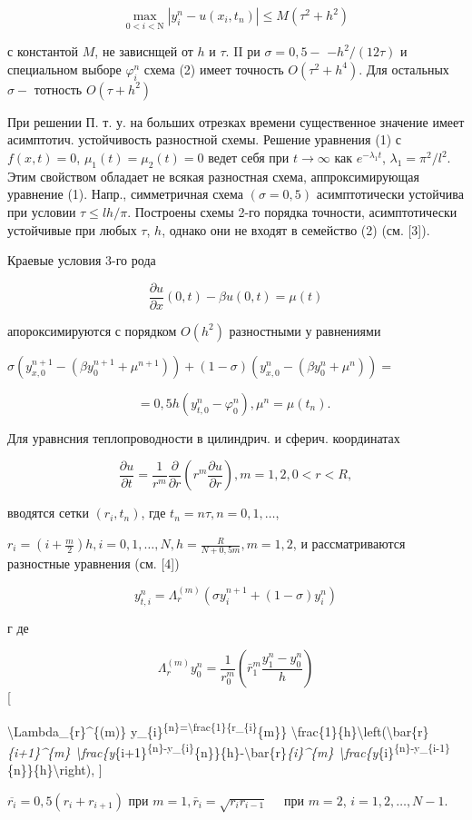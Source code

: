 \documentclass[10pt]{article}
\begin{document}
\[
\max _{0<i<\mathrm{N}}\left|y_{i}^{n}-u\left(x_{i}, t_{n}\right)\right| \leqslant M\left(\tau^{2}+h^{2}\right)
\]

с константой $M$, не зависнщей от $h$ и $\tau$. II ри $\sigma=0,5-$ $-h^{2} /(12 \tau)$ и специальном выборе $\varphi_{i}^{n}$ схема (2) имеет точность $O\left(\tau^{2}+h^{4}\right)$. Для остальных $\sigma-$ тотность $O\left(\tau+h^{2}\right)$

При решении П. т. у. на больших отрезках времени существенное значение имеет асимптотич. устойчивость разностной схемы. Решение уравнения (1) с $f(x, t)=0$, $\mu_{1}(t)=\mu_{2}(t)=0$ ведет себя при $t \rightarrow \infty$ как $e^{-\lambda_{1} t}$, $\lambda_{1}=\pi^{2} / l^{2}$. Этим свойством обладает не всякая разностная схема, аппроксимирующая уравнение (1). Напр., симметричная схема $(\sigma=0,5)$ асимптотически устойчива при условии $\tau \leqslant l h / \pi$. Построены схемы 2-го порядка точности, асимптотически устойчивые при любых $\tau$, $h$, однако они не входят в семейство (2) (см. [3]).

Краевые условия 3-го рода

\[
\frac{\partial u}{\partial x}(0, t)-\beta u(0, t)=\mu(t)
\]

апороксимируются с порядком $O\left(h^{2}\right)$ разностными у равнениями

$\sigma\left(y_{x, 0}^{n+1}-\left(\beta y_{0}^{n+1}+\mu^{n+1}\right)\right)+(1-\sigma)\left(y_{x, 0}^{n}-\left(\beta y_{0}^{n}+\mu^{n}\right)\right)=$

\[
=0,5 h\left(y_{t, 0}^{n}-\varphi_{0}^{n}\right), \mu^{n}=\mu\left(t_{n}\right) \text {. }
\]

Для уравнсния теплопроводности в цилиндрич. и сферич. координатах

\[
\frac{\partial u}{\partial t}=\frac{1}{r^{m}} \frac{\partial}{\partial r}\left(r^{m} \frac{\partial u}{\partial r}\right), m=1,2,0<r<R,
\]

вводятся сетки $\left(r_{i}, t_{n}\right)$, где $t_{n}=n \tau, n=0,1, \ldots$,

$r_{i}=\left(i+\frac{m}{2}\right) h, i=0,1, \ldots, N, h=\frac{R}{N+0,5 m}, m=1,2$, и рассматриваются разностные уравнения (см. [4])

\[
y_{t, i}^{n}=\Lambda_{r}^{(m)}\left(\sigma y_{i}^{n+1}+(1-\sigma) y_{i}^{n}\right)
\]

г де

\[
\Lambda_{r}^{(m)} y_{0}^{n}=\frac{1}{r_{0}^{m}}\left(\bar{r}_{1}^{m} \frac{y_{1}^{n}-y_{0}^{n}}{h}\right)
\][

\textbackslash Lambda\_\{r\}\^{}\{(m)\} y\_\{i\}\textsuperscript{\{n\}=\textbackslash frac\{1\}\{r\_\{i\}}\{m\}\} \textbackslash frac\{1\}\{h\}\textbackslash left(\textbackslash bar\{r\}\textit{\{i+1\}\^{}\{m\} \textbackslash frac\{y}\{i+1\}\textsuperscript{\{n\}-y\_\{i\}}\{n\}\}\{h\}-\textbackslash bar\{r\}\textit{\{i\}\^{}\{m\} \textbackslash frac\{y}\{i\}\textsuperscript{\{n\}-y\_\{i-1\}}\{n\}\}\{h\}\textbackslash right),
]

$\overline{r_{i}}=0,5\left(r_{i}+r_{i+1}\right)$ при $m=1, \bar{r}_{i}=\sqrt{r_{i} r_{i-1}} \quad$ при $m=2$, $i=1,2, \ldots, N-1$.
\end{document}

